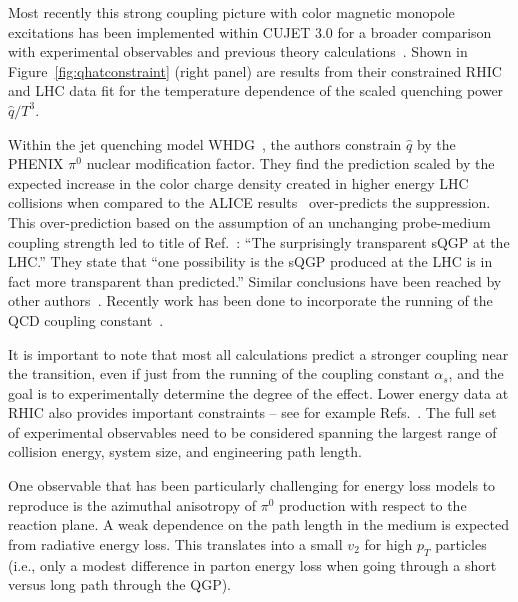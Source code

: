 Most recently this strong coupling picture with color magnetic monopole excitations has been
implemented within CUJET 3.0 for a broader comparison with experimental observables and
previous theory calculations~\cite{Xu:2014tda}.   Shown in Figure~\ref{fig:qhatconstraint} (right panel) are
results from their constrained RHIC and LHC data fit for the temperature dependence of the scaled
quenching power $\hat{q}/T^{3}$.


Within the jet quenching model WHDG~\cite{Horowitz:2011gd}, the authors 
constrain $\hat{q}$ by the PHENIX $\pi^{0}$ nuclear modification factor.  
They find the prediction scaled by the expected increase in the color charge 
density created in higher energy LHC collisions when compared to the ALICE
results~\cite{Aamodt:2010jd} over-predicts the suppression.
This over-prediction based on the assumption of an unchanging probe-medium
coupling strength led to title of Ref.~\cite{Horowitz:2011gd}: ``The
surprisingly transparent sQGP at the LHC.''  They state that ``one
possibility is the sQGP produced at the LHC is in fact more
transparent than predicted.''  Similar conclusions have been reached
by other authors~\cite{Chen:2011vt,Zakharov:2011ws,Buzzatti:2011vt}.
Recently work has been done to incorporate the running of the QCD coupling
constant~\cite{Buzzatti:2012dy}.  

It is important to note that most all calculations predict a stronger
coupling near the transition, even if just from the running of the
coupling constant $\alpha_{s}$, and the goal is to experimentally
determine the degree of the effect.  Lower energy data at RHIC also
provides important constraints -- see for example
Refs.~\cite{Adare:2012uk,Schmah:2013vea}.  The full set of
experimental observables need to be considered spanning the largest
range of collision energy, system size, and engineering path length.

One observable that has been particularly challenging for energy loss
models to reproduce is the azimuthal anisotropy of $\pi^0$ production
with respect to the reaction plane.  A weak dependence on the path
length in the medium is expected from radiative energy loss.  This
translates into a small $v_2$ for high $p_T$ particles (i.e., only a
modest difference in parton energy loss when going through a short
versus long path through the QGP).  

